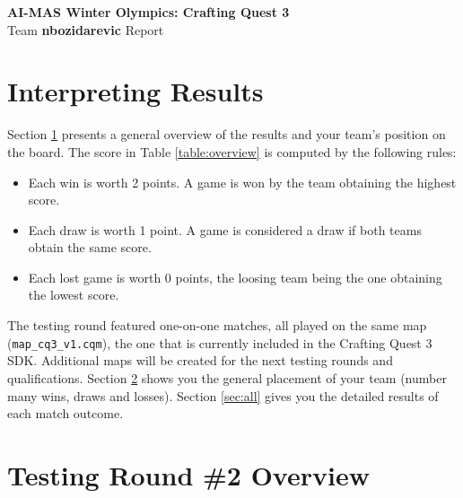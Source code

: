 \documentclass[a4paper,12pt]{article}
\begin{document}
\begin{center}
  {\huge \textbf{AI-MAS Winter Olympics: Crafting Quest 3}} \\
  {\huge Team \textbf{ nbozidarevic } Report}
\end{center}


\section{Interpreting Results}
\label{sec:overview}

\par Section \ref{sec:overview} presents a general overview of the
results and your team's position on the board. The score in Table
\ref{table:overview} is computed by the following rules:
\begin{itemize}
\item Each win is worth 2 points. A game is won by the team obtaining
  the highest score.
\item Each draw is worth 1 point. A game is considered a draw if both
  teams obtain the same score.
\item Each lost game is worth 0 points, the loosing team being the one
  obtaining the lowest score.
\end{itemize}

The testing round featured one-on-one matches, all played on the same
map (\verb|map_cq3_v1.cqm|), the one that is currently included in the
Crafting Quest 3 SDK. Additional maps will be created for the next
testing rounds and qualifications.  Section \ref{sec:general} shows
you the general placement of your team (number many wins, draws and
losses).  Section \ref{sec:all} gives you the detailed results of each
match outcome.

\section{Testing Round \#2 Overview}
\label{sec:general}
\end{document}
